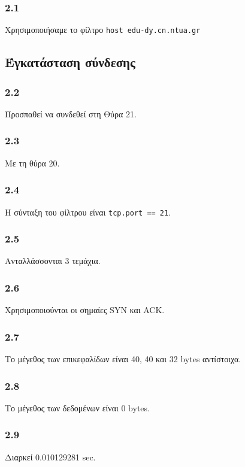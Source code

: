 		\subsubsection*{2.1} 
			Χρησιμοποιήσαμε το φίλτρο \verb|host edu-dy.cn.ntua.gr|
		
		\subsection*{Έγκατάσταση σύνδεσης}
		
		\subsubsection*{2.2} 
			Προσπαθεί να συνδεθεί στη Θύρα 21.
			
		
		\subsubsection*{2.3} 
			Με τη θύρα 20.
		
		\subsubsection*{2.4} 
			Η σύνταξη του φίλτρου είναι \verb|tcp.port == 21|.
		
		\subsubsection*{2.5} 
			Ανταλλάσσονται 3 τεμάχια.
		
		\subsubsection*{2.6} 
			Χρησιμοποιούνται οι σημαίες SYN και ACK.
		
		\subsubsection*{2.7} 
			Το μέγεθος των επικεφαλίδων είναι 40, 40 και 32 bytes αντίστοιχα.
		
		\subsubsection*{2.8} 
			Το μέγεθος των δεδομένων είναι 0 bytes.
		
		\subsubsection*{2.9} 
			Διαρκεί 0.010129281 sec.
		
